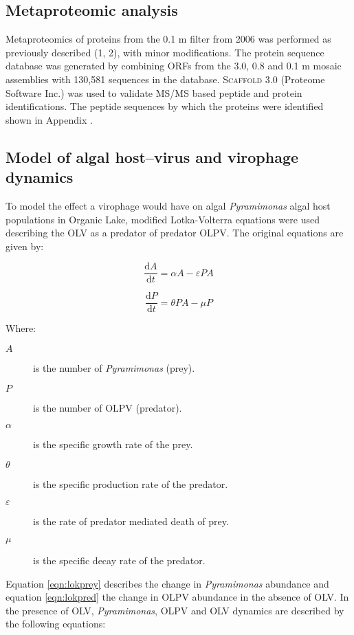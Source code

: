 \subsection{Metaproteomic analysis}
Metaproteomics of proteins from the 0.1 \textmu{}m filter from 2006 was performed as previously described (1, 2), with minor modifications. 
The protein sequence database was generated by combining ORFs from the 3.0, 0.8 and 0.1 \textmu{}m mosaic assemblies with 130,581 sequences in the database. 
\textsc{Scaffold} 3.0 (Proteome Software Inc.) was used to validate MS/MS based peptide and protein identifications. 
The peptide sequences by which the proteins were identified shown in Appendix .

\subsection[Algal Host--Virus and Virophage Dynamics]{Model of algal host--virus and virophage dynamics}
To model the effect a virophage would have on algal \emph{Pyramimonas} algal host populations in Organic Lake, modified Lotka-Volterra equations were used describing the \ac{OLV} as a predator of predator \ac{OLPV}. 
The original equations are given by:

\begin{equation}
\frac{\mathrm{d}A}{\mathrm{d}t}=\alpha A - \varepsilon PA
\label{eqn:lokprey}
\end{equation}

\begin{equation}
\frac{\mathrm{d}P}{\mathrm{d}t}= \theta PA - \mu P
\label{eqn:lokpred}
\end{equation}

Where:
\begin{description}
\item[$A$] is the number of \emph{Pyramimonas} (prey).
\item[$P$] is the number of \ac{OLPV} (predator).
\item[$\alpha$] is the specific growth rate of the prey.
\item[$\theta$] is the specific production rate of the predator.
\item[$\varepsilon$] is the rate of predator mediated death of prey.
\item[$\mu$] is the specific decay rate of the predator.
\end{description}

Equation \ref{eqn:lokprey} describes the change in \emph{Pyramimonas} abundance and equation \ref{eqn:lokpred} the change in \ac{OLPV} abundance in the absence of \ac{OLV}.
In the presence of \ac{OLV}, \emph{Pyramimonas}, \ac{OLPV} and \ac{OLV} dynamics are described by the following equations:

